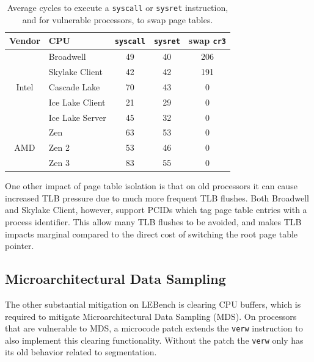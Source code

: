 \begin{table}[h]
  \begin{center}
  \begin{tabular}{clccc} 
    \textbf{Vendor} & \textbf{CPU} & \textbf{\texttt{syscall}} & \textbf{\texttt{sysret}}  & \textbf{swap \texttt{cr3}} \\ \hline 
    \multirow{5}{*}{Intel} & Broadwell             & 49 & 40 & 206 \\
                           & Skylake Client        & 42 & 42 & 191 \\
                           & Cascade Lake          & 70 & 43 & 0 \\
                           & Ice Lake Client       & 21 & 29 & 0 \\
                           & Ice Lake Server       & 45 & 32 & 0 \\ \hline
      \multirow{3}{*}{AMD} & Zen                   & 63 & 53 & 0 \\
                           & Zen 2                 & 53 & 46 & 0 \\
                           & Zen 3                 & 83 & 55 & 0 \\ \hline
  \end{tabular}
  \end{center}
  \caption{Average cycles to execute a \texttt{syscall} or \texttt{sysret} instruction, and for vulnerable processors, to swap page tables. }
  \label{table:meltdown}
\end{table}

One other impact of page table isolation is that on old processors it can cause increased TLB pressure due to much more frequent TLB flushes.
Both Broadwell and Skylake Client, however, support PCIDs which tag page table entries with a process identifier.
This allow many TLB flushes to be avoided, and makes TLB impacts marginal compared to the direct cost of switching the root page table pointer.

\subsection{Microarchitectural Data Sampling}

The other substantial mitigation on LEBench is clearing CPU buffers, which is required to mitigate Microarchitectural Data Sampling (MDS).
On processors that are vulnerable to MDS, a microcode patch extends the \texttt{verw} instruction to also implement this clearing functionality.
Without the patch the \texttt{verw} only has its old behavior related to segmentation.

